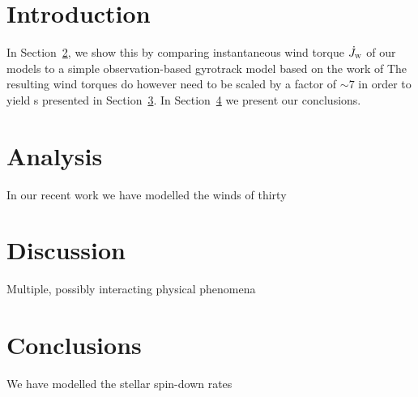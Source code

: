 



\section{Introduction}

In Section~\ref{sec:analysis}, we show this by comparing instantaneous wind torque \(\dot J_{\textsc{w}}\) of our models to a simple observation-based gyrotrack model based on the work of
The resulting wind torques do however need to be scaled by a factor of \(\sim 7\) in order to yield s presented in Section~\ref{sec:Discussion}.
In Section~\ref{sec:Conclusions} we present our conclusions.



%
%
\section{Analysis}\label{sec:analysis}

In our recent work we have modelled the winds of thirty



%
%
\section{Discussion}\label{sec:Discussion}

Multiple, possibly interacting physical phenomena

%
%
\section{Conclusions}\label{sec:Conclusions}
We have modelled the stellar spin-down rates

